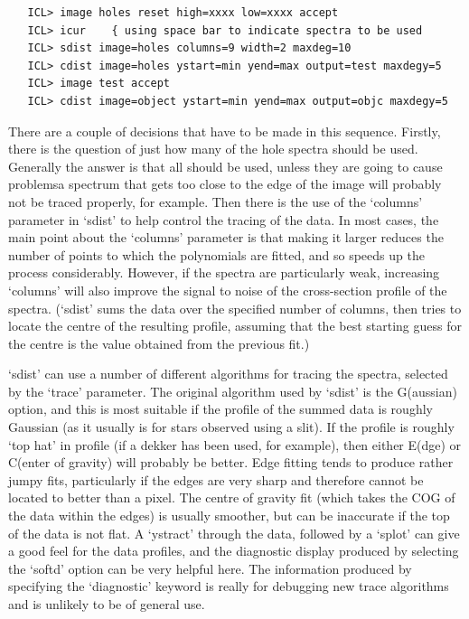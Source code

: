 \begin{verbatim}
   ICL> image holes reset high=xxxx low=xxxx accept
   ICL> icur    { using space bar to indicate spectra to be used
   ICL> sdist image=holes columns=9 width=2 maxdeg=10
   ICL> cdist image=holes ystart=min yend=max output=test maxdegy=5
   ICL> image test accept
   ICL> cdist image=object ystart=min yend=max output=objc maxdegy=5
\end{verbatim}

   There are a couple of decisions that have to be made in this
   sequence. Firstly, there is the question of just how many of the hole
   spectra should be used.  Generally the answer is that all should be
   used, unless they are going to cause problems\latorhtm{---}{-}a spectrum
   that gets
   too close to the edge of the image will probably not be traced
   properly, for example.  Then there is the use of the `columns'
   parameter in `sdist' to help control the tracing of the data. In most
   cases, the main point about the `columns' parameter is that making it
   larger reduces the number of points to which the polynomials are
   fitted, and so speeds up the process considerably.  However, if the
   spectra are particularly weak, increasing `columns' will also improve
   the signal to noise of the cross-section profile of the spectra.
   (`sdist' sums the data over the specified number of columns, then
   tries to locate the centre of the resulting profile, assuming that
   the best starting guess for the centre is the value obtained from the
   previous fit.)

   `sdist' can use a number of different algorithms for tracing the
   spectra, selected by the `trace' parameter.  The original algorithm
   used by `sdist' is the G(aussian) option, and this is most suitable
   if the profile of the summed data is roughly Gaussian (as it usually
   is for stars observed using a slit).  If the profile is roughly `top
   hat' in profile (if a dekker has been used, for example), then either
   E(dge) or C(enter of gravity) will probably be better.  Edge fitting
   tends to produce rather jumpy fits, particularly if the edges are
   very sharp and therefore cannot be located to better than a pixel.
   The centre of gravity fit (which takes the COG of the data within the
   edges) is usually smoother, but can be inaccurate if the top of the
   data is not flat.  A `ystract' through the data, followed by a
   `splot' can give a good feel for the data profiles, and the
   diagnostic display produced by selecting the `softd' option can be
   very helpful here.  The information produced by specifying the
   `diagnostic' keyword is really for debugging new trace algorithms and
   is unlikely to be of general use.

